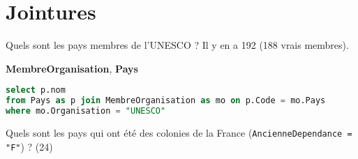 \section{Jointures}
\begin{Exercise}
Quels sont les pays membres de l'UNESCO ? Il y en a 192 (188 vrais membres).
\end{Exercise}
{\bf MembreOrganisation}, {\bf Pays}
\begin{Answer}
\begin{lstlisting}[language=SQL]
select p.nom
from Pays as p join MembreOrganisation as mo on p.Code = mo.Pays
where mo.Organisation = "UNESCO"
\end{lstlisting}
\end{Answer}
\begin{Exercise}
Quels sont les pays qui ont été des colonies de la France (\texttt{AncienneDependance = "F"}) ? (24)

\end{Exercise}

